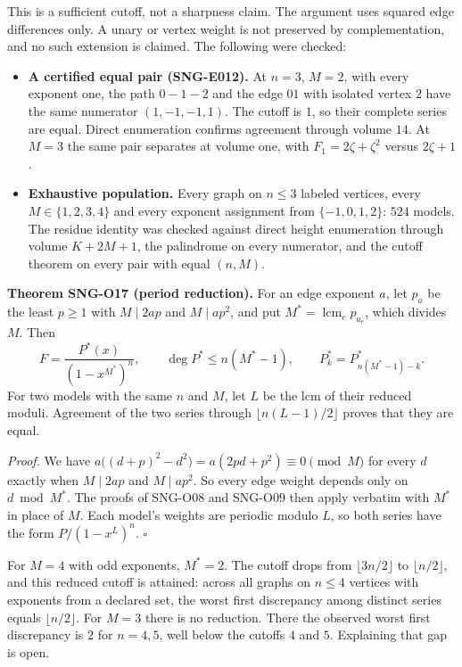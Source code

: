 \documentclass[
  11pt,
  a4paper,
]{report}
\providecommand{\tightlist}{%
  \setlength{\itemsep}{0pt}\setlength{\parskip}{0pt}}
\begin{document}
This is a sufficient cutoff, not a sharpness claim. The argument uses
squared edge differences only. A unary or vertex weight is not preserved
by complementation, and no such extension is claimed. The following were
checked:

\begin{itemize}
\tightlist
\item
  \textbf{A certified equal pair (SNG-E012).} At \(n=3\), \(M=2\), with
  every exponent one, the path \(0-1-2\) and the edge \(01\) with
  isolated vertex \(2\) have the same numerator \((1,-1,-1,1)\). The
  cutoff is \(1\), so their complete series are equal. Direct
  enumeration confirms agreement through volume \(14\). At \(M=3\) the
  same pair separates at volume one, with \(F_1=2\zeta+\zeta^2\) versus
  \(2\zeta+1\).
\item
  \textbf{Exhaustive population.} Every graph on \(n\le3\) labeled
  vertices, every \(M\in\{1,2,3,4\}\) and every exponent assignment from
  \(\{-1,0,1,2\}\): \(524\) models. The residue identity was checked
  against direct height enumeration through volume \(K+2M+1\), the
  palindrome on every numerator, and the cutoff theorem on every pair
  with equal \((n,M)\).
\end{itemize}

\textbf{Theorem SNG-O17 (period reduction).} For an edge exponent \(a\),
let \(p_a\) be the least \(p\ge1\) with \(M\mid 2ap\) and
\(M\mid ap^2\), and put \(M^*=\operatorname{lcm}_ep_{a_e}\), which
divides \(M\). Then \[
F=\frac{P^*(x)}{(1-x^{M^*})^n},\qquad \deg P^*\le n(M^*-1),\qquad P^*_k=P^*_{n(M^*-1)-k}.
\] For two models with the same \(n\) and \(M\), let \(L\) be the lcm of
their reduced moduli. Agreement of the two series through
\(\lfloor n(L-1)/2\rfloor\) proves that they are equal.

\emph{Proof.} We have
\(a\bigl((d+p)^2-d^2\bigr)=a(2pd+p^2)\equiv0\pmod M\) for every \(d\)
exactly when \(M\mid 2ap\) and \(M\mid ap^2\). So every edge weight
depends only on \(d \bmod M^*\). The proofs of SNG-O08 and SNG-O09 then
apply verbatim with \(M^*\) in place of \(M\). Each model's weights are
periodic modulo \(L\), so both series have the form \(P/(1-x^L)^n\).
\(\square\)

For \(M=4\) with odd exponents, \(M^*=2\). The cutoff drops from
\(\lfloor 3n/2\rfloor\) to \(\lfloor n/2\rfloor\), and this reduced
cutoff is attained: across all graphs on \(n\le4\) vertices with
exponents from a declared set, the worst first discrepancy among
distinct series equals \(\lfloor n/2\rfloor\). For \(M=3\) there is no
reduction. There the observed worst first discrepancy is \(2\) for
\(n=4,5\), well below the cutoffs \(4\) and \(5\). Explaining that gap
is open.
\end{document}
